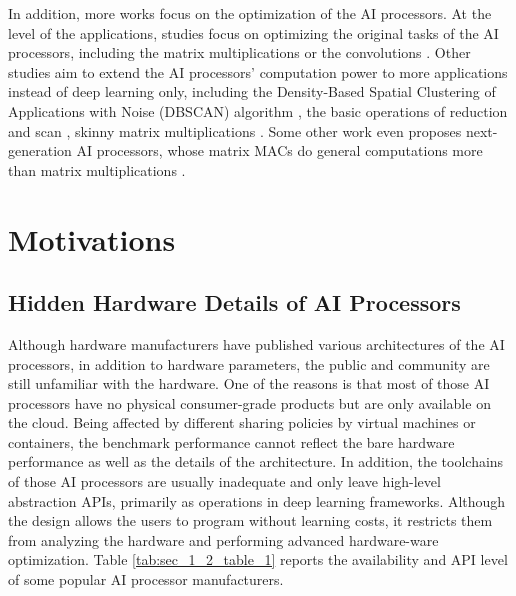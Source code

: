 \documentclass[12pt]{extbook}
\begin{document}
In addition, more works focus on the optimization of the AI processors. At the level of the applications, studies focus on optimizing the original tasks of the AI processors, including the matrix multiplications \cite{DBLP:conf/ipps/00020C20} or the convolutions \cite{DBLP:conf/ppopp/YanWC20}. Other studies aim to extend the AI processors' computation power to more applications instead of deep learning only, including the Density-Based Spatial Clustering of Applications with Noise (DBSCAN) algorithm \cite{DBLP:conf/icpp/JiW21}, the basic operations of reduction and scan \cite{DBLP:conf/sccc/CarrascoVN18, DBLP:conf/ics/DakkakLXGH19}, skinny matrix multiplications \cite{DBLP:conf/ic-nc/TangK0K20}. Some other work even proposes next-generation AI processors, whose matrix MACs do general computations more than matrix multiplications \cite{10.1145/3470496.3527411}.

\section{Motivations}
\label{sec_1_2_motivations}

\subsection{Hidden Hardware Details of AI Processors}

Although hardware manufacturers have published various architectures of the AI processors, in addition to hardware parameters, the public and community are still unfamiliar with the hardware. One of the reasons is that most of those AI processors have no physical consumer-grade products but are only available on the cloud. Being affected by different sharing policies by virtual machines or containers, the benchmark performance cannot reflect the bare hardware performance as well as the details of the architecture. In addition, the toolchains of those AI processors are usually inadequate and only leave high-level abstraction APIs, primarily as operations in deep learning frameworks. Although the design allows the users to program without learning costs, it restricts them from analyzing the hardware and performing advanced hardware-ware optimization. Table \ref{tab:sec_1_2_table_1} reports the availability and API level of some popular AI processor manufacturers.
\end{document}
